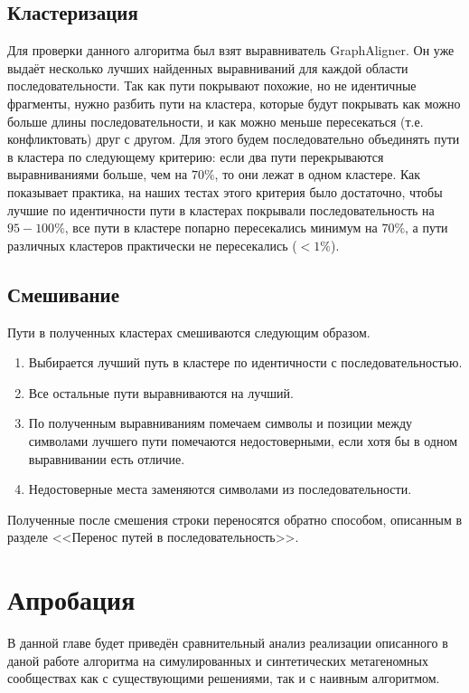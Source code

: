 \documentclass[14pt]{matmex-diploma-custom}
\begin{document}
\subsection{Кластеризация}
\begin{sloppypar}
Для проверки данного алгоритма был взят выравниватель GraphAligner. Он уже выдаёт несколько лучших найденных выравниваний для каждой области последовательности. Так как пути покрывают похожие, но не идентичные фрагменты, нужно разбить пути на кластера, которые будут покрывать как можно больше длины последовательности, и как можно меньше пересекаться (т.е. конфликтовать) друг с другом. Для этого будем последовательно объединять пути в кластера по следующему критерию: если два пути перекрываются выравниваниями больше, чем на $70\%$, то они лежат в одном кластере. Как показывает практика, на наших тестах этого критерия было достаточно, чтобы лучшие по идентичности пути в кластерах покрывали последовательность на $95-100\%$, все пути в кластере попарно пересекались минимум на $70\%$, а пути различных кластеров практически не пересекались ($<1\%$).
\end{sloppypar}

\subsection{Смешивание}
Пути в полученных кластерах смешиваются следующим образом.
\begin{enumerate}
    \item Выбирается лучший путь в кластере по идентичности с последовательностью.
    \item Все остальные пути выравниваются на лучший.
    \item По полученным выравниваниям помечаем символы и позиции между символами лучшего пути помечаются недостоверными, если хотя бы в одном выравнивании есть отличие.
    \item Недостоверные места заменяются символами из последовательности.
\end{enumerate}

Полученные после смешения строки переносятся обратно способом, описанным в разделе <<Перенос путей в последовательность>>.


\section{Апробация}
В данной главе будет приведён сравнительный анализ реализации описанного в даной работе алгоритма на симулированных и синтетических метагеномных сообществах как с существующими решениями, так и с наивным алгоритмом.
\end{document}

